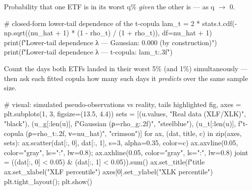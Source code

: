 \documentclass{pyportfolios-note}
\begin{document}
\noteneedroom{150bp}


Probability that one ETF is in its worst q\% \textit{given} the other is — as
q $\rightarrow$ 0.

\begin{notecode}
# closed-form lower-tail dependence of the t-copula
lam_t = 2 * stats.t.cdf(-np.sqrt((nu_hat + 1) * (1 - rho_t) / (1 + rho_t)), df=nu_hat + 1)
print(f"Lower-tail dependence λ — Gaussian: 0.000 (by construction)")
print(f"Lower-tail dependence λ — t-copula: {lam_t:.3f}")
\end{notecode}


Count the days both ETFs landed in their worst 5\% (and 1\%) simultaneously —
then ask each fitted copula how many such days it \textit{predicts} over the
same sample size.


\begin{notecode}
# visual: simulated pseudo-observations vs reality, tails highlighted
fig, axes = plt.subplots(1, 3, figsize=(13.5, 4.4))
sets = [(u.values, "Real data (XLF/XLK)", "black"),
        (u_g[:len(u)], f"Gaussian (ρ={rho_g:.2f})", "steelblue"),
        (u_t[:len(u)], f"t-copula (ρ={rho_t:.2f}, ν={nu_hat})", "crimson")]
for ax, (dat, title, c) in zip(axes, sets):
    ax.scatter(dat[:, 0], dat[:, 1], s=3, alpha=0.35, color=c)
    ax.axvline(0.05, color="gray", ls=":", lw=0.8); ax.axhline(0.05, color="gray", ls=":", lw=0.8)
    joint = ((dat[:, 0] < 0.05) & (dat[:, 1] < 0.05)).sum()
    ax.set_title(f"{title}%
    ax.set_xlabel("XLF percentile")
axes[0].set_ylabel("XLK percentile")
plt.tight_layout(); plt.show()
\end{notecode}
\end{document}
